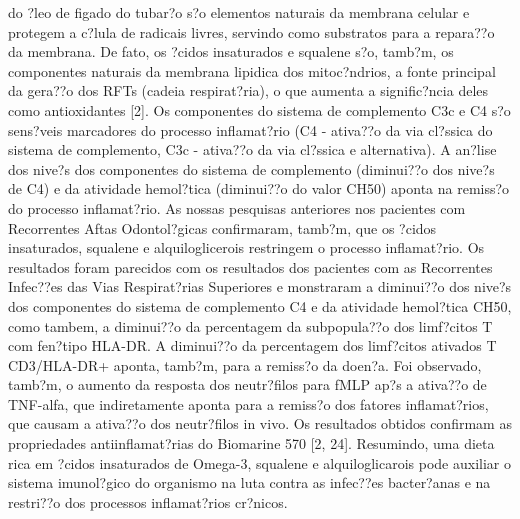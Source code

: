 \documentclass[12pt]{article}
\begin{document}
do ?leo de figado do tubar?o s?o elementos naturais da membrana celular
e protegem a c?lula de radicais livres, servindo como substratos para a
repara??o da membrana. De fato, os ?cidos insaturados e squalene s?o,
tamb?m, os componentes naturais da membrana lipidica dos mitoc?ndrios, a
fonte principal da gera??o dos RFTs (cadeia respirat?ria), o que
aumenta a signific?ncia deles como antioxidantes [2].
 Os componentes do sistema de complemento C3c e C4 s?o sens?veis
marcadores do processo inflamat?rio (C4 - ativa??o da via cl?ssica do sistema
de complemento, C3c - ativa??o da via cl?ssica e alternativa). A
an?lise dos nive?s dos componentes do sistema de complemento (diminui??o dos
nive?s de C4) e da atividade hemol?tica (diminui??o do valor CH50)
aponta na remiss?o do processo inflamat?rio. As nossas pesquisas anteriores
nos pacientes com Recorrentes Aftas Odontol?gicas confirmaram, tamb?m,
que os ?cidos insaturados, squalene e alquiloglicerois restringem o
processo inflamat?rio. Os resultados foram parecidos com os resultados dos
pacientes com as Recorrentes Infec??es das Vias Respirat?rias
Superiores e monstraram a diminui??o dos nive?s dos componentes do sistema de
complemento C4 e da atividade hemol?tica CH50, como tambem, a diminui??o
da percentagem da subpopula??o dos limf?citos T com fen?tipo HLA-DR. A
diminui??o da percentagem dos limf?citos ativados T CD3/HLA-DR+ aponta,
tamb?m, para a remiss?o da doen?a. Foi observado, tamb?m, o aumento da
resposta dos neutr?filos para fMLP ap?s a ativa??o de TNF-alfa, que
indiretamente aponta para a remiss?o dos fatores inflamat?rios, que causam
a ativa??o dos neutr?filos in vivo. Os resultados obtidos confirmam as
propriedades antiinflamat?rias do Biomarine 570 [2, 24].
 Resumindo, uma dieta rica em ?cidos insaturados de Omega-3, squalene e
alquiloglicarois pode auxiliar o sistema imunol?gico do organismo na
luta contra as infec??es bacter?anas e na restri??o dos processos
inflamat?rios cr?nicos.
\end{document}
